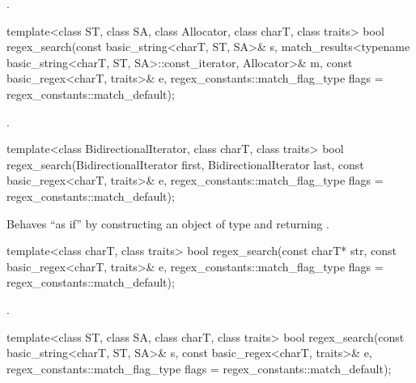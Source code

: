 \begin{itemdescr}
\pnum
\returns
{}.
\end{itemdescr}

%
\begin{itemdecl}
template<class ST, class SA, class Allocator, class charT, class traits>
  bool regex_search(const basic_string<charT, ST, SA>& s,
                    match_results<typename basic_string<charT, ST, SA>::const_iterator,
                                  Allocator>& m,
                    const basic_regex<charT, traits>& e,
                    regex_constants::match_flag_type flags = regex_constants::match_default);
\end{itemdecl}

\begin{itemdescr}
\pnum
\returns
{}.
\end{itemdescr}

%
\begin{itemdecl}
template<class BidirectionalIterator, class charT, class traits>
  bool regex_search(BidirectionalIterator first, BidirectionalIterator last,
                    const basic_regex<charT, traits>& e,
                    regex_constants::match_flag_type flags = regex_constants::match_default);
\end{itemdecl}

\begin{itemdescr}
\pnum
\effects
Behaves ``as if'' by constructing an object 
of type  and returning
.
\end{itemdescr}

%
\begin{itemdecl}
template<class charT, class traits>
  bool regex_search(const charT* str,
                    const basic_regex<charT, traits>& e,
                    regex_constants::match_flag_type flags = regex_constants::match_default);
\end{itemdecl}

\begin{itemdescr}
\pnum
\returns
{}.
\end{itemdescr}

%
\begin{itemdecl}
template<class ST, class SA, class charT, class traits>
  bool regex_search(const basic_string<charT, ST, SA>& s,
                    const basic_regex<charT, traits>& e,
                    regex_constants::match_flag_type flags = regex_constants::match_default);
\end{itemdecl}

